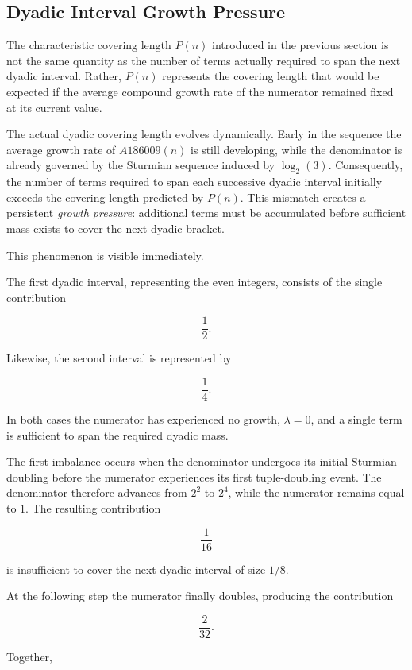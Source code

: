 \documentclass[12pt, oneside]{article}
\numberwithin{equation}{section}
\theoremstyle{definition}
\theoremstyle{plain}
\theoremstyle{remark}
\begin{document}
\subsection{Dyadic Interval Growth Pressure}

The characteristic covering length $P(n)$ introduced in the previous section is
not the same quantity as the number of terms actually required to span the next
dyadic interval. Rather, $P(n)$ represents the covering length that would be
expected if the average compound growth rate of the numerator remained fixed at
its current value.

The actual dyadic covering length evolves dynamically. Early in the sequence the
average growth rate of $A186009(n)$ is still developing, while the denominator is
already governed by the Sturmian sequence induced by $\log_2(3)$. Consequently,
the number of terms required to span each successive dyadic interval initially
exceeds the covering length predicted by $P(n)$. This mismatch creates a persistent
\emph{growth pressure}: additional terms must be accumulated before sufficient mass
exists to cover the next dyadic bracket.

This phenomenon is visible immediately.

The first dyadic interval, representing the even integers, consists of the single contribution

\[
\frac12.
\]

Likewise, the second interval is represented by

\[
\frac14.
\]

In both cases the numerator has experienced no growth, $\lambda=0$, and a single term is sufficient to span the required dyadic mass.

The first imbalance occurs when the denominator undergoes its initial Sturmian doubling before the numerator experiences its first tuple-doubling event. The denominator therefore advances from $2^2$ to $2^4$, while the numerator remains equal to $1$. The resulting contribution

\[
\frac1{16}
\]

is insufficient to cover the next dyadic interval of size $1/8$.

At the following step the numerator finally doubles, producing the contribution

\[
\frac2{32}.
\]

Together,
\end{document}
